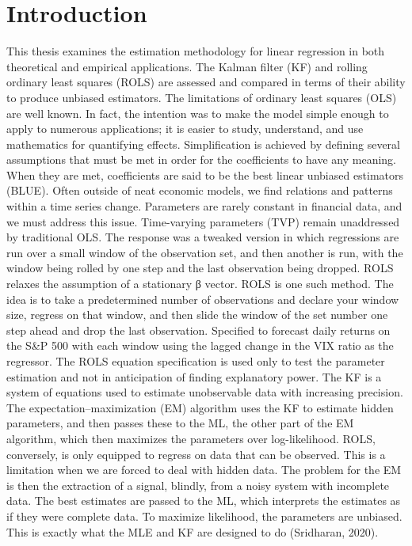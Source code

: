 \documentclass[12pt, letterpaper, twoside]{article}
\begin{document}
\section{Introduction}
This thesis examines the estimation methodology for linear regression in both theoretical and empirical applications. The Kalman filter (KF) and rolling ordinary least squares (ROLS) are assessed and compared in terms of their ability to produce unbiased estimators. The limitations of ordinary least squares (OLS) are well known. In fact, the intention was to make the model simple enough to apply to numerous applications; it is easier to study, understand, and use mathematics for quantifying effects. Simplification is achieved by defining several assumptions that must be met in order for the coefficients to have any meaning. When they are met, coefficients are said to be the best linear unbiased estimators (BLUE). Often outside of neat economic models, we find relations and patterns within a time series change. Parameters are rarely constant in financial data, and we must address this issue. Time-varying parameters (TVP) remain unaddressed by traditional OLS. The response was a tweaked version in which regressions are run over a small window of the observation set, and then another is run, with the window being rolled by one step and the last observation being dropped. ROLS relaxes the assumption of a stationary β vector. ROLS is one such method. The idea is to take a predetermined number of observations and declare your window size, regress on that window, and then slide the window of the set number one step ahead and drop the last observation. Specified to forecast daily returns on the S&P 500 with each window using the lagged change in the VIX ratio as the regressor. The ROLS equation specification is used only to test the parameter estimation and not in anticipation of finding explanatory power. The KF is a system of equations used to estimate unobservable data with increasing precision. The expectation–maximization (EM) algorithm uses the KF to estimate hidden parameters, and then passes these to the ML, the other part of the EM algorithm, which then maximizes the parameters over log-likelihood. ROLS, conversely, is only equipped to regress on data that can be observed. This is a limitation when we are forced to deal with hidden data. The problem for the EM is then the extraction of a signal, blindly, from a noisy system with incomplete data. The best estimates are passed to the ML, which interprets the estimates as if they were complete data. To maximize likelihood, the parameters are unbiased. This is exactly what the MLE and KF are designed to do (Sridharan, 2020). 
\end{document}
